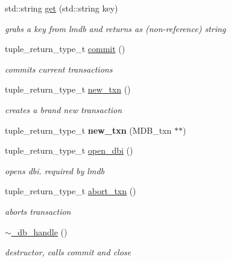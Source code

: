 \begin{DoxyCompactItemize}
std\+::string \hyperlink{structmods_1_1lmdb_1_1__db__handle_a55bcadafaf012aeb3dcef782eb0d782c}{get} (std\+::string key)
\begin{DoxyCompactList}\small\item\em grabs a key from lmdb and returns as (non-\/reference) string \end{DoxyCompactList}\item 
tuple\+\_\+return\+\_\+type\+\_\+t \hyperlink{structmods_1_1lmdb_1_1__db__handle_accce5da22ddddad187ca266cab1740e7}{commit} ()
\begin{DoxyCompactList}\small\item\em commits current transactions \end{DoxyCompactList}\item 
tuple\+\_\+return\+\_\+type\+\_\+t \hyperlink{structmods_1_1lmdb_1_1__db__handle_a2bed96ee84f6d91bb6bbb0cba95aef0e}{new\+\_\+txn} ()
\begin{DoxyCompactList}\small\item\em creates a brand new transaction \end{DoxyCompactList}\item 
\mbox{\label{structmods_1_1lmdb_1_1__db__handle_aa3cd410c05c781f763072da6ad3a3a97}} 
tuple\+\_\+return\+\_\+type\+\_\+t {\bfseries new\+\_\+txn} (M\+D\+B\+\_\+txn $\ast$$\ast$)
\item 
tuple\+\_\+return\+\_\+type\+\_\+t \hyperlink{structmods_1_1lmdb_1_1__db__handle_af4d870ecebe05e17ce680dc9058e6aa2}{open\+\_\+dbi} ()
\begin{DoxyCompactList}\small\item\em opens dbi. required by lmdb \end{DoxyCompactList}\item 
tuple\+\_\+return\+\_\+type\+\_\+t \hyperlink{structmods_1_1lmdb_1_1__db__handle_a7d3cb6143fb5e400319d8f42826d5661}{abort\+\_\+txn} ()
\begin{DoxyCompactList}\small\item\em aborts transaction \end{DoxyCompactList}\item 
\mbox{\label{structmods_1_1lmdb_1_1__db__handle_a3b7a0de70ab87f5f00ff217b4daeb1eb}} 
\hyperlink{structmods_1_1lmdb_1_1__db__handle_a3b7a0de70ab87f5f00ff217b4daeb1eb}{$\sim$\+\_\+db\+\_\+handle} ()
\begin{DoxyCompactList}\small\item\em destructor, calls commit and close \end{DoxyCompactList}\item 
$$
\end{DoxyCompactItemize}

